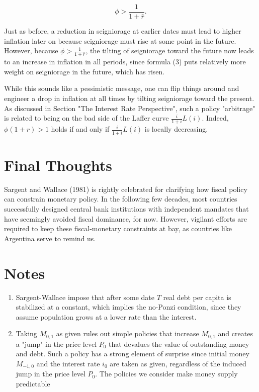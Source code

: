 \documentclass[10pt]{article}
\begin{document}
\begin{equation*}
\phi>\frac{1}{1+\bar{r}} .
\end{equation*}

Just as before, a reduction in seigniorage at earlier dates must lead to higher inflation later on because seigniorage must rise at some point in the future. However, because $\phi>\frac{1}{1+\bar{r}}$, the tilting of seigniorage toward the future now leads to an increase in inflation in all periods, since formula (3) puts relatively more weight on seigniorage in the future, which has risen.

While this sounds like a pessimistic message, one can flip things around and engineer a drop in inflation at all times by tilting seigniorage toward the present. As discussed in Section "The Interest Rate Perspective", such a policy "arbitrage" is related to being on the bad side of the Laffer curve $\frac{i}{1+i} L(i)$. Indeed, $\phi(1+r)>1$ holds if and only if $\frac{i}{1+i} L(i)$ is locally decreasing.

\section*{Final Thoughts}
Sargent and Wallace (1981) is rightly celebrated for clarifying how fiscal policy can constrain monetary policy. In the following few decades, most countries successfully designed central bank institutions with independent mandates that have seemingly avoided fiscal dominance, for now. However, vigilant efforts are required to keep these fiscal-monetary constraints at bay, as countries like Argentina serve to remind us.

\section*{Notes}
\begin{enumerate}
  \item Sargent-Wallace impose that after some date $T$ real debt per capita is stabilized at a constant, which implies the no-Ponzi condition, since they assume population grows at a lower rate than the interest.
  \item Taking $M_{0,1}$ as given rules out simple policies that increase $M_{0,1}$ and creates a "jump" in the price level $P_{0}$ that devalues the value of outstanding money and debt. Such a policy has a strong element of surprise since initial money $M_{-1,0}$ and the interest rate $i_{0}$ are taken as given, regardless of the induced jump in the price level $P_{0}$. The policies we consider make money supply predictable
\end{enumerate}
\end{document}
